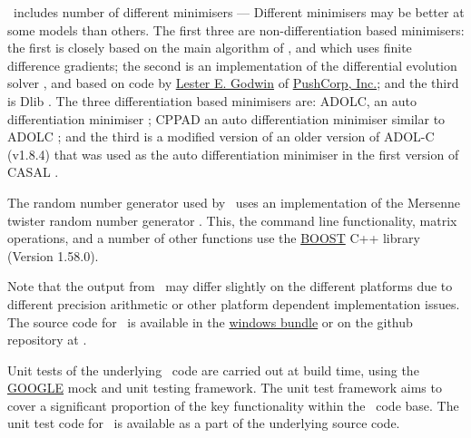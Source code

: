 \CNAME\ includes number of different minimisers --- Different minimisers may be better at some models than others. The first three are non-differentiation based minimisers: the first is closely based on the main algorithm of \cite{779}, and which uses finite difference gradients; the second is an implementation of the differential evolution solver \citep{1442}, and based on code by \href{mailto:<godwin@pushcorp.com>}{Lester E. Godwin} of \href{http://www.pushcorp.com}{PushCorp, Inc.}; and the third is Dlib \citep{dlib09}. The three differentiation based minimisers are: ADOLC, an auto differentiation minimiser \citep{walther1996adolc}; CPPAD an auto differentiation minimiser similar to ADOLC \citep{wachter2006cppad}; and the third is a modified version of an older version of ADOL-C (v1.8.4) that was used as the auto differentiation minimiser in the first version of CASAL \citep{1388}.

The random number generator used by \CNAME\ uses an implementation of the Mersenne twister random number generator \citep{796}. This, the command line functionality, matrix operations, and a number of other functions use the \href{http://www.boost.org/}{BOOST} C++ library (Version 1.58.0).

Note that the output from \CNAME\ may differ slightly on the different platforms due to different precision arithmetic or other platform dependent implementation issues. The source code for \CNAME\ is available in the \href{ftp://ftp.niwa.co.nz/incoming/CASAL2_auto_build/casal2.tar.gz}{windows bundle} or on the github repository at \github .

Unit tests of the underlying \CNAME\ code are carried out at build time, using the \href{http://www.boost.org/}{GOOGLE} mock and unit testing framework. The unit test framework aims to cover a significant proportion of the key functionality within the \CNAME\ code base. The unit test code for \CNAME\ is available as a part of the underlying source code.

